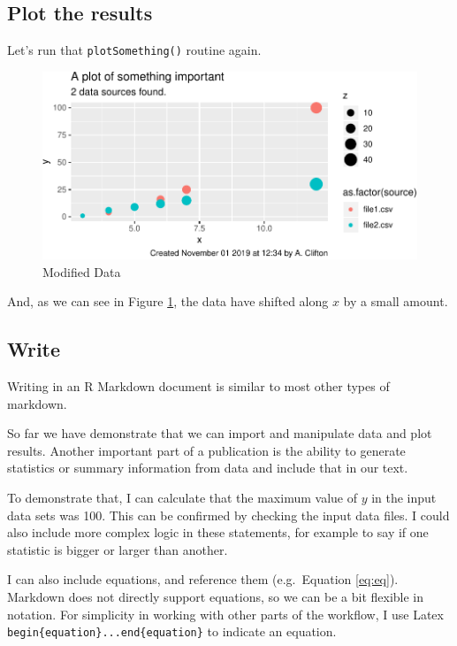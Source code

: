 \documentclass[11pt,]{article}
\begin{document}
\hypertarget{plot-the-results}{%
\subsection{Plot the results}\label{plot-the-results}}

Let's run that \texttt{plotSomething()} routine again.

\begin{figure}
\centering
\includegraphics{main_files/figure-latex/plot-modified-data-1.pdf}
\caption{\label{fig:plot-modified-data}Modified Data}
\end{figure}

And, as we can see in Figure \ref{fig:plot-modified-data}, the data have shifted along \(x\) by a small amount.

\hypertarget{implementWrite}{%
\subsection{Write}\label{implementWrite}}

Writing in an R Markdown document is similar to most other types of markdown.

So far we have demonstrate that we can import and manipulate data and plot results. Another important part of a publication is the ability to generate statistics or summary information from data and include that in our text.

To demonstrate that, I can calculate that the maximum value of \(y\) in the input data sets was 100. This can be confirmed by checking the input data files. I could also include more complex logic in these statements, for example to say if one statistic is bigger or larger than another.

I can also include equations, and reference them (e.g.~Equation \eqref{eq:eq}). Markdown does not directly support equations, so we can be a bit flexible in notation. For simplicity in working with other parts of the workflow, I use Latex \texttt{begin\{equation\}...end\{equation\}} to indicate an equation.
\end{document}
